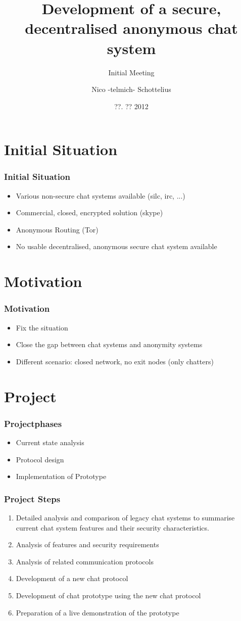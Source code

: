 \documentclass{beamer}
\title{Development of a secure, decentralised anonymous chat system}
\subtitle{Initial Meeting}
\author{Nico -telmich- Schottelius}
\date{??. ?? 2012}
\begin{document}
\frame{\titlepage}

\frame{\tableofcontents}

\section{Initial Situation}

\frame
{
  \frametitle{Initial Situation}
  \begin{itemize}
  \item Various non-secure chat systems available (silc, irc, ...)
  \item Commercial, closed, encrypted solution (skype)
  \item Anonymous Routing (Tor)
  \item No usable decentralised, anonymous secure chat system available
  \end{itemize}
}

\section{Motivation}
\frame
{
  \frametitle{Motivation}
  \begin{itemize}
     \item Fix the situation
     \item Close the gap between chat systems and anonymity systems
     \item Different scenario: closed network, no exit nodes (only chatters)
  \end{itemize}
}

\section{Project}
\frame
{
  \frametitle{Projectphases}
  \begin{itemize}
     \item Current state analysis
     \item Protocol design
     \item Implementation of Prototype
  \end{itemize}
}

\frame
{
  \frametitle{Project Steps}
  \begin{enumerate}
     \item Detailed analysis and comparison of legacy chat systems
        to summarise current chat system features and their
        security characteristics.
    \item Analysis of features and security requirements
    \item Analysis of related communication protocols
    \item Development of a new chat protocol
    \item Development of chat prototype using the new chat protocol
    \item Preparation of a live demonstration of the prototype
  \end{enumerate}
}
\end{document}
